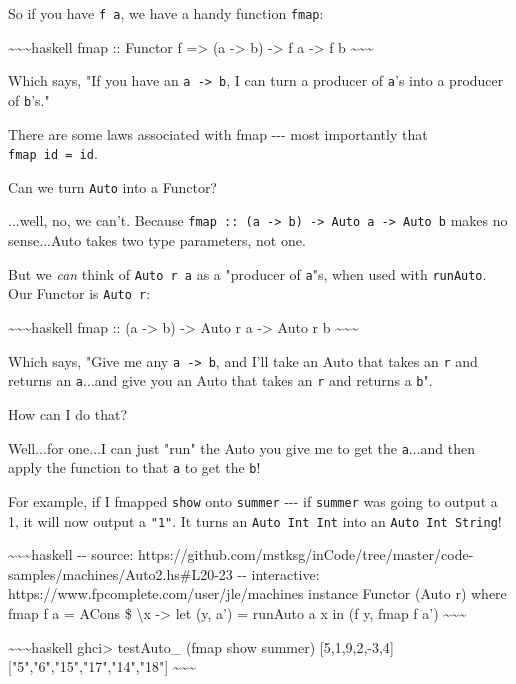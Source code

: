 \documentclass[]{article}
\begin{document}
So if you have \texttt{f\ a}, we have a handy function \texttt{fmap}:

\textasciitilde{}\textasciitilde{}\textasciitilde{}haskell fmap :: Functor f
=\textgreater{} (a -\textgreater{} b) -\textgreater{} f a -\textgreater{} f b
\textasciitilde{}\textasciitilde{}\textasciitilde{}

Which says, "If you have an \texttt{a\ -\textgreater{}\ b}, I can turn a
producer of \texttt{a}'s into a producer of \texttt{b}'s."

There are some laws associated with fmap -\/-\/- most importantly that
\texttt{fmap\ id\ =\ id}.

Can we turn \texttt{Auto} into a Functor?

...well, no, we can't. Because
\texttt{fmap\ ::\ (a\ -\textgreater{}\ b)\ -\textgreater{}\ Auto\ a\ -\textgreater{}\ Auto\ b}
makes no sense...Auto takes two type parameters, not one.

But we \emph{can} think of \texttt{Auto\ r\ a} as a "producer of \texttt{a}"s,
when used with \texttt{runAuto}. Our Functor is \texttt{Auto\ r}:

\textasciitilde{}\textasciitilde{}\textasciitilde{}haskell fmap :: (a
-\textgreater{} b) -\textgreater{} Auto r a -\textgreater{} Auto r b
\textasciitilde{}\textasciitilde{}\textasciitilde{}

Which says, "Give me any \texttt{a\ -\textgreater{}\ b}, and I'll take an Auto
that takes an \texttt{r} and returns an \texttt{a}...and give you an Auto that
takes an \texttt{r} and returns a \texttt{b}".

How can I do that?

Well...for one...I can just "run" the Auto you give me to get the
\texttt{a}...and then apply the function to that \texttt{a} to get the
\texttt{b}!

For example, if I fmapped \texttt{show} onto \texttt{summer} -\/-\/- if
\texttt{summer} was going to output a 1, it will now output a \texttt{"1"}. It
turns an \texttt{Auto\ Int\ Int} into an \texttt{Auto\ Int\ String}!

\textasciitilde{}\textasciitilde{}\textasciitilde{}haskell -\/- source:
https://github.com/mstksg/inCode/tree/master/code-samples/machines/Auto2.hs\#L20-23
-\/- interactive: https://www.fpcomplete.com/user/jle/machines instance Functor
(Auto r) where fmap f a = ACons \$ \textbackslash{}x -\textgreater{} let (y, a')
= runAuto a x in (f y, fmap f a')
\textasciitilde{}\textasciitilde{}\textasciitilde{}

\textasciitilde{}\textasciitilde{}\textasciitilde{}haskell ghci\textgreater{}
testAuto\_ (fmap show summer) {[}5,1,9,2,-3,4{]}
{[}"5","6","15","17","14","18"{]}
\textasciitilde{}\textasciitilde{}\textasciitilde{}
\end{document}
